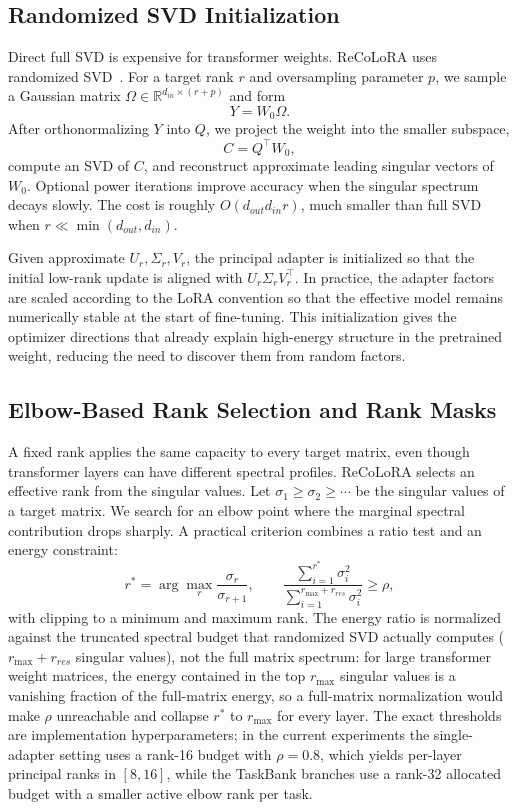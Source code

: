 \documentclass[11pt]{article}
\begin{document}
\subsection{Randomized SVD Initialization}
Direct full SVD is expensive for transformer weights. ReCoLoRA uses randomized SVD~\cite{halko2011finding}. For a target rank $r$ and oversampling parameter $p$, we sample a Gaussian matrix $\Omega \in \mathbb{R}^{d_{in}\times (r+p)}$ and form
\begin{equation}
    Y = W_0\Omega.
\end{equation}
After orthonormalizing $Y$ into $Q$, we project the weight into the smaller subspace,
\begin{equation}
    C = Q^\top W_0,
\end{equation}
compute an SVD of $C$, and reconstruct approximate leading singular vectors of $W_0$. Optional power iterations improve accuracy when the singular spectrum decays slowly. The cost is roughly $O(d_{out}d_{in}r)$, much smaller than full SVD when $r \ll \min(d_{out},d_{in})$.

Given approximate $U_r,\Sigma_r,V_r$, the principal adapter is initialized so that the initial low-rank update is aligned with $U_r\Sigma_rV_r^\top$. In practice, the adapter factors are scaled according to the LoRA convention so that the effective model remains numerically stable at the start of fine-tuning. This initialization gives the optimizer directions that already explain high-energy structure in the pretrained weight, reducing the need to discover them from random factors.

\subsection{Elbow-Based Rank Selection and Rank Masks}
A fixed rank applies the same capacity to every target matrix, even though transformer layers can have different spectral profiles. ReCoLoRA selects an effective rank from the singular values. Let $\sigma_1\geq\sigma_2\geq\cdots$ be the singular values of a target matrix. We search for an elbow point where the marginal spectral contribution drops sharply. A practical criterion combines a ratio test and an energy constraint:
\begin{equation}
    r^* = \arg\max_r \frac{\sigma_r}{\sigma_{r+1}}, \qquad
    \frac{\sum_{i=1}^{r^*}\sigma_i^2}{\sum_{i=1}^{r_{\max}+r_{res}}\sigma_i^2} \geq \rho,
    \label{eq:elbow}
\end{equation}
with clipping to a minimum and maximum rank. The energy ratio is normalized against the truncated spectral budget that randomized SVD actually computes ($r_{\max}+r_{res}$ singular values), not the full matrix spectrum: for large transformer weight matrices, the energy contained in the top $r_{\max}$ singular values is a vanishing fraction of the full-matrix energy, so a full-matrix normalization would make $\rho$ unreachable and collapse $r^*$ to $r_{\max}$ for every layer. The exact thresholds are implementation hyperparameters; in the current experiments the single-adapter setting uses a rank-16 budget with $\rho=0.8$, which yields per-layer principal ranks in $[8,16]$, while the TaskBank branches use a rank-32 allocated budget with a smaller active elbow rank per task.
\end{document}
